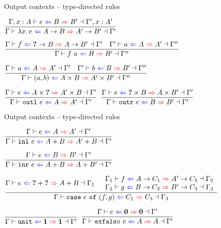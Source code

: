 \documentclass{beamer}
\begin{document}
\begin{frame}{Output contexts -- type-directed rules}

\begin{center}
  $\infrule{\fulloutctx{\extend{\Gamma}{x}{A}}{e}{B}{B'}{\extend{\Gamma'}{x}{A'}}}{\outctx{\fun{x}{e}}{\Fun{A}{B}}{\Fun{A'}{B'}}}$

  \vspace{1em}

  $\infrule{\fulloutctx{\Gamma}{f}{\Fun{\Hole}{B}}{\Fun{A}{B'}}{\Gamma'} \quad \fulloutctx{\Gamma'}{a}{A}{A'}{\Gamma''}}{\fulloutctx{\Gamma}{\app{f}{a}}{B}{B'}{\Gamma''}}$

  \vspace{1em}

  $\infrule{\fulloutctx{\Gamma}{a}{A}{A'}{\Gamma'} \quad \fulloutctx{\Gamma'}{b}{B}{B'}{\Gamma''}}{\fulloutctx{\Gamma}{\pair{a}{b}}{\Prod{A}{B}}{\Prod{A'}{B'}}{\Gamma''}}$

  \vspace{1em}

  $\infrule{\outctx{e}{\Prod{A}{\Hole}}{\Prod{A'}{B}}}{\outctx{\outl{e}}{A}{A'}}$
  \quad
  $\infrule{\outctx{e}{\Prod{\Hole}{B}}{\Prod{A}{B'}}}{\outctx{\outr{e}}{B}{B'}}$
\end{center}

\end{frame}

\begin{frame}{Output contexts -- type-directed rules}

\begin{center}
  $\infrule{\outctx{e}{A}{A'}}{\outctx{\inl{e}}{\Sum{A}{B}}{\Sum{A'}{B}}}$

  \vspace{2em}

  $\infrule{\outctx{e}{B}{B'}}{\outctx{\inr{e}}{\Sum{A}{B}}{\Sum{A}{B'}}}$

  \vspace{2em}

  $\infrule{\fulloutctx{\Gamma}{e}{\Sum{\Hole}{\Hole}}{\Sum{A}{B}}{\Gamma_1} \quad \begin{array}{c} \fulloutctx{\Gamma_1}{f}{\Fun{A}{C_1}}{\Fun{A'}{C_2}}{\Gamma_2} \\ \fulloutctx{\Gamma_2}{g}{\Fun{B}{C_2}}{\Fun{B'}{C_3}}{\Gamma_3} \end{array}}{\fulloutctx{\Gamma}{\case{e}{f}{g}}{C_1}{C_3}{\Gamma_3}}$

  \vspace{2em}

  $\infrule{}{\outctx{\unit}{\Unit}{\Unit}}$
  \quad
  $\infrule{\outctx{e}{\Empty}{\Empty}}{\outctx{\exfalso{e}}{A}{A}}$
\end{center}

\end{frame}
\end{document}
